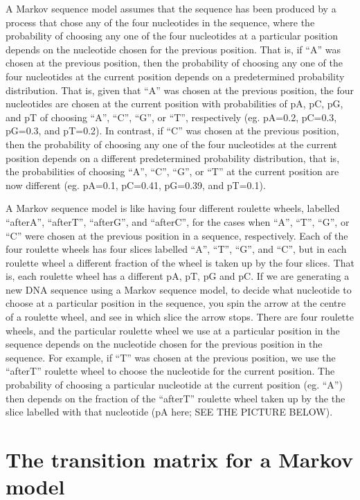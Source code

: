 \documentclass[
]{book}
\begin{document}
A Markov sequence model assumes that the sequence has been produced by a process that chose any of the four nucleotides in the sequence, where the probability of choosing any one of the four nucleotides at a particular position depends on the nucleotide chosen for the previous position. That is, if ``A'' was chosen at the previous position, then the probability of choosing any one of the four nucleotides at the current position depends on a predetermined probability distribution. That is, given that ``A'' was chosen at the previous position, the four nucleotides are chosen at the current position with probabilities of pA, pC, pG, and pT of choosing ``A'', ``C'', ``G'', or ``T'', respectively (eg. pA=0.2, pC=0.3, pG=0.3, and pT=0.2). In contrast, if ``C'' was chosen at the previous position, then the probability of choosing any one of the four nucleotides at the current position depends on a different predetermined probability distribution, that is, the probabilities of choosing ``A'', ``C'', ``G'', or ``T'' at the current position are now different (eg. pA=0.1, pC=0.41, pG=0.39, and pT=0.1).

A Markov sequence model is like having four different roulette wheels, labelled ``afterA'', ``afterT'', ``afterG'', and ``afterC'', for the cases when ``A'', ``T'', ``G'', or ``C'' were chosen at the previous position in a sequence, respectively. Each of the four roulette wheels has four slices labelled ``A'', ``T'', ``G'', and ``C'', but in each roulette wheel a different fraction of the wheel is taken up by the four slices. That is, each roulette wheel has a different pA, pT, pG and pC. If we are generating a new DNA sequence using a Markov sequence model, to decide what nucleotide to choose at a particular position in the sequence, you spin the arrow at the centre of a roulette wheel, and see in which slice the arrow stops. There are four roulette wheels, and the particular roulette wheel we use at a particular position in the sequence depends on the nucleotide chosen for the previous position in the sequence. For example, if ``T'' was chosen at the previous position, we use the ``afterT'' roulette wheel to choose the nucleotide for the current position. The probability of choosing a particular nucleotide at the current position (eg. ``A'') then depends on the fraction of the ``afterT'' roulette wheel taken up by the the slice labelled with that nucleotide (pA here; SEE THE PICTURE BELOW).

\hypertarget{the-transition-matrix-for-a-markov-model}{%
\section{The transition matrix for a Markov model}\label{the-transition-matrix-for-a-markov-model}}
\end{document}
